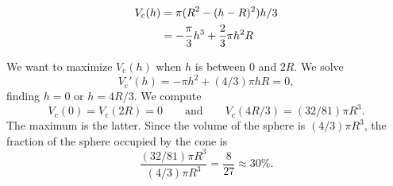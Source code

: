 \begin{example}
\begin{solution}
    \begin{align*}
     V_{\text{c}}(h)&=\pi(R^2-(h-R)^2)h/3 \\
    &=-{\pi\over3}h^3+{2\over3}\pi h^2R
    \end{align*}
    
    We want to maximize $V_{\text{c}}(h)$ when $h$ is between 0 and $2R$.  We
    solve 
    \[
    V_{\text{c}}'(h)=-\pi h^2+(4/3)\pi h R=0,
    \] 
    finding $h=0$ or $h=4R/3$.  We compute
    \[
    V_{\text{c}}(0)=V_{\text{c}}(2R)=0\qquad\text{and}\qquad V_{\text{c}}(4R/3)=(32/81)\pi R^3.
    \] 
    The maximum is the latter. Since the volume of the sphere is $(4/3)\pi
    R^3$, the fraction of the sphere occupied by the cone is
    \[
    \frac{(32/81)\pi R^3}{(4/3)\pi R^3}=\frac{8}{27}\approx 30\%.
    \]
    \end{solution}
\end{example}

